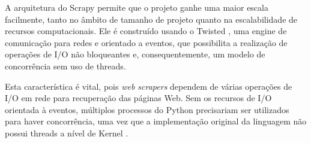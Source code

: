 A arquitetura do Scrapy permite que o projeto ganhe uma maior escala facilmente, tanto no âmbito de tamanho de projeto quanto na escalabilidade de recursos computacionais. Ele é construído usando o Twisted \cite{twisted}, uma engine de comunicação para redes e orientado a eventos, que possibilita a realização de operações de I/O não bloqueantes e, consequentemente, um modelo de concorrência sem uso de threads. 

Esta característica é vital, pois \emph{web scrapers} dependem de várias operações de I/O em rede para recuperação das páginas Web. Sem os recursos de I/O orientada à eventos, múltiplos processos do Python precisariam ser utilizados para haver concorrência, uma vez que a implementação original da linguagem não possui threads a nível de Kernel \cite{python_threads}.

